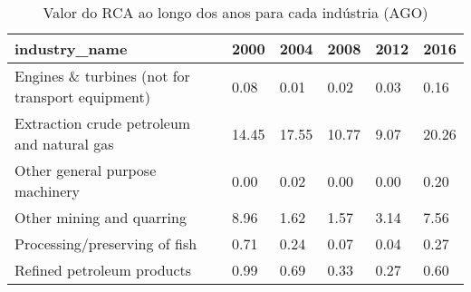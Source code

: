 \begin{table}
\centering
\caption{Valor do RCA ao longo dos anos para cada indústria (AGO)}
\begin{tabular}{p{6cm}p{1.5cm}p{1.5cm}p{1.5cm}p{1.5cm}p{1.5cm}}
\toprule
                                   industry\_name &  2000 &  2004 &  2008 & 2012 &  2016 \\
\midrule
Engines \& turbines (not for transport equipment) &  0.08 &  0.01 &  0.02 & 0.03 &  0.16 \\
      Extraction crude petroleum and natural gas & 14.45 & 17.55 & 10.77 & 9.07 & 20.26 \\
                 Other general purpose machinery &  0.00 &  0.02 &  0.00 & 0.00 &  0.20 \\
                       Other mining and quarring &  8.96 &  1.62 &  1.57 & 3.14 &  7.56 \\
                   Processing/preserving of fish &  0.71 &  0.24 &  0.07 & 0.04 &  0.27 \\
                      Refined petroleum products &  0.99 &  0.69 &  0.33 & 0.27 &  0.60 \\
\bottomrule
\end{tabular}
\end{table}
